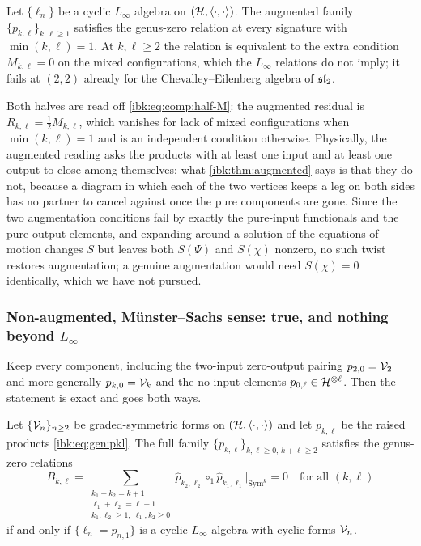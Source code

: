\begin{theorem}
  \label{ibk:thm:augmented}
  Let $\{\ell_n\}$ be a cyclic $L_\infty$ algebra on $({\mathcal{H}},\braket{\cdot,\cdot})$. The augmented family $\{p_{k,\ell}\}_{k,\ell\ge1}$ satisfies the genus-zero relation at every signature with $\min(k,\ell)=1$. At $k,\ell\ge2$ the relation is equivalent to the extra condition $M_{k,\ell}=0$ on the mixed configurations, which the $L_\infty$ relations do not imply; it fails at $(2,2)$ already for the Chevalley--Eilenberg algebra of $\mathfrak{sl}_2$.
\end{theorem}

Both halves are read off \eqref{ibk:eq:comp:half-M}: the augmented residual is $R_{k,\ell}=\frac12M_{k,\ell}$, which vanishes for lack of mixed configurations when $\min(k,\ell)=1$ and is an independent condition otherwise. Physically, the augmented reading asks the products with at least one input and at least one output to close among themselves; what \cref{ibk:thm:augmented} says is that they do not, because a diagram in which each of the two vertices keeps a leg on both sides has no partner to cancel against once the pure components are gone. Since the two augmentation conditions fail by exactly the pure-input functionals and the pure-output elements, and expanding around a solution of the equations of motion changes $S$ but leaves both $S(\Psi)$ and $S(\chi)$ nonzero, no such twist restores augmentation; a genuine augmentation would need $S(\chi)=0$ identically, which we have not pursued.

\subsubsection{Non-augmented, M\"unster--Sachs sense: true, and nothing beyond \texorpdfstring{$L_\infty$}{L-infinity}}
\label{ibk:sec:senses:non-aug}

Keep every component, including the two-input zero-output pairing $p_{2,0}={\mathcal{V}}_2$ and more generally $p_{k,0}={\mathcal{V}}_k$ and the no-input elements $p_{0,\ell}\in{\mathcal{H}}^{\otimes\ell}$. Then the statement is exact and goes both ways.

\begin{theorem}
  \label{ibk:thm:non-augmented}
  Let $\{{\mathcal{V}}_n\}_{n\ge2}$ be graded-symmetric forms on $({\mathcal{H}},\braket{\cdot,\cdot})$ and let $p_{k,\ell}$ be the raised products \eqref{ibk:eq:gen:pkl}. The full family $\{p_{k,\ell}\}_{k,\ell\ge0,\,k+\ell\ge2}$ satisfies the genus-zero relations
  \begin{equation}
    \label{ibk:eq:senses:non-augmented}
    B_{k,\ell}
      = \sum_{\substack{k_1+k_2=k+1\\ \ell_1+\ell_2=\ell+1\\ k_1,\ell_2\ge1;\ \ell_1,k_2\ge0}}
        \hat p_{k_2,\ell_2}\circ_1\hat p_{k_1,\ell_1}\Big|_{\mathrm{Sym}^k}
      = 0
    \quad\text{for all }(k,\ell)
  \end{equation}
  if and only if $\{\ell_n=p_{n,1}\}$ is a cyclic $L_\infty$ algebra with cyclic forms ${\mathcal{V}}_n$.
\end{theorem}

